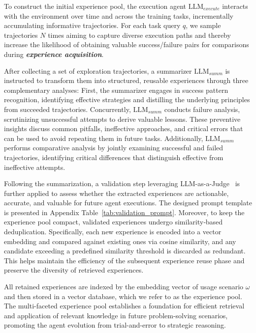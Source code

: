 \documentclass[11pt]{article}
\begin{document}
To construct the initial experience pool, the execution agent $\text{LLM}_{execute}$ interacts with the environment over time and across the training tasks, incrementally accumulating informative trajectories. 
For each task query $q$, we sample trajectories $N$ times aiming to capture diverse execution paths and thereby increase the likelihood of obtaining valuable success/failure pairs for comparisons during \textbf{\textit{experience acquisition}}.

After collecting a set of exploration trajectories, a summarizer $\text{LLM}_{summ}$ is instructed to transform them into structured, reusable experiences through three complementary analyses: 
First, the summarizer engages in success pattern recognition, identifying effective strategies and distilling the underlying principles from succeeded trajectories. 
Concurrently, $\text{LLM}_{summ}$ conducts failure analysis, scrutinizing unsuccessful attempts to derive valuable lessons. 
These preventive insights discuss common pitfalls, ineffective approaches, and critical errors that can be used to avoid repeating them in future tasks.  
Additionally, $\text{LLM}_{summ}$ performs comparative analysis by jointly examining successful and failed trajectories, identifying critical differences that distinguish effective from ineffective attempts.

Following the summarization, a validation step leveraging LLM-as-a-Judge~\citep{zheng2023judging} is further applied to assess whether the extracted experiences are actionable, accurate, and valuable for future agent executions. 
The designed prompt template is presented in Appendix Table~\ref{tab:validation_prompt}. 
Moreover, to keep the experience pool compact, validated experiences undergo similarity‑based deduplication. 
Specifically, each new experience is encoded into a vector embedding and compared against existing ones via cosine similarity, and any candidate exceeding a predefined similarity threshold is discarded as redundant.
This helps maintain the efficiency of the subsequent experience reuse phase and preserve the diversity of retrieved experiences.

All retained experiences are indexed by the embedding vector of usage scenario $\omega$ and then stored in a vector database, which we refer to as the experience pool. 
The multi-faceted experience pool establishes a foundation for efficient retrieval and application of relevant knowledge in future problem-solving scenarios, promoting the agent evolution from trial-and-error to strategic reasoning.
\end{document}
